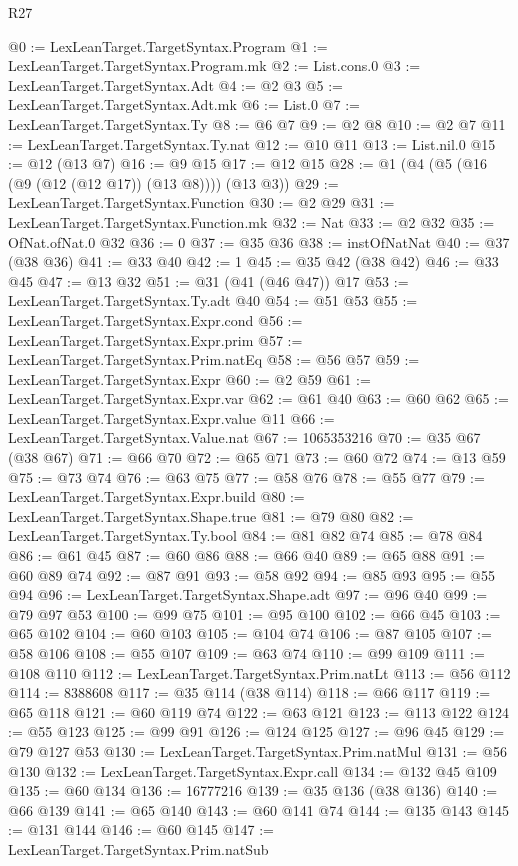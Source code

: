 \begin{lexlean}{R27}
\begin{coremodule}
@0 := LexLeanTarget.TargetSyntax.Program
@1 := LexLeanTarget.TargetSyntax.Program.mk
@2 := List.cons.{0}
@3 := LexLeanTarget.TargetSyntax.Adt
@4 := @2 @3
@5 := LexLeanTarget.TargetSyntax.Adt.mk
@6 := List.{0}
@7 := LexLeanTarget.TargetSyntax.Ty
@8 := @6 @7
@9 := @2 @8
@10 := @2 @7
@11 := LexLeanTarget.TargetSyntax.Ty.nat
@12 := @10 @11
@13 := List.nil.{0}
@15 := @12 (@13 @7)
@16 := @9 @15
@17 := @12 @15
@28 := @1 (@4 (@5 (@16 (@9 (@12 (@12 @17)) (@13 @8)))) (@13 @3))
@29 := LexLeanTarget.TargetSyntax.Function
@30 := @2 @29
@31 := LexLeanTarget.TargetSyntax.Function.mk
@32 := Nat
@33 := @2 @32
@35 := OfNat.ofNat.{0} @32
@36 := 0
@37 := @35 @36
@38 := instOfNatNat
@40 := @37 (@38 @36)
@41 := @33 @40
@42 := 1
@45 := @35 @42 (@38 @42)
@46 := @33 @45
@47 := @13 @32
@51 := @31 (@41 (@46 @47)) @17
@53 := LexLeanTarget.TargetSyntax.Ty.adt @40
@54 := @51 @53
@55 := LexLeanTarget.TargetSyntax.Expr.cond
@56 := LexLeanTarget.TargetSyntax.Expr.prim
@57 := LexLeanTarget.TargetSyntax.Prim.natEq
@58 := @56 @57
@59 := LexLeanTarget.TargetSyntax.Expr
@60 := @2 @59
@61 := LexLeanTarget.TargetSyntax.Expr.var
@62 := @61 @40
@63 := @60 @62
@65 := LexLeanTarget.TargetSyntax.Expr.value @11
@66 := LexLeanTarget.TargetSyntax.Value.nat
@67 := 1065353216
@70 := @35 @67 (@38 @67)
@71 := @66 @70
@72 := @65 @71
@73 := @60 @72
@74 := @13 @59
@75 := @73 @74
@76 := @63 @75
@77 := @58 @76
@78 := @55 @77
@79 := LexLeanTarget.TargetSyntax.Expr.build
@80 := LexLeanTarget.TargetSyntax.Shape.true
@81 := @79 @80
@82 := LexLeanTarget.TargetSyntax.Ty.bool
@84 := @81 @82 @74
@85 := @78 @84
@86 := @61 @45
@87 := @60 @86
@88 := @66 @40
@89 := @65 @88
@91 := @60 @89 @74
@92 := @87 @91
@93 := @58 @92
@94 := @85 @93
@95 := @55 @94
@96 := LexLeanTarget.TargetSyntax.Shape.adt
@97 := @96 @40
@99 := @79 @97 @53
@100 := @99 @75
@101 := @95 @100
@102 := @66 @45
@103 := @65 @102
@104 := @60 @103
@105 := @104 @74
@106 := @87 @105
@107 := @58 @106
@108 := @55 @107
@109 := @63 @74
@110 := @99 @109
@111 := @108 @110
@112 := LexLeanTarget.TargetSyntax.Prim.natLt
@113 := @56 @112
@114 := 8388608
@117 := @35 @114 (@38 @114)
@118 := @66 @117
@119 := @65 @118
@121 := @60 @119 @74
@122 := @63 @121
@123 := @113 @122
@124 := @55 @123
@125 := @99 @91
@126 := @124 @125
@127 := @96 @45
@129 := @79 @127 @53
@130 := LexLeanTarget.TargetSyntax.Prim.natMul
@131 := @56 @130
@132 := LexLeanTarget.TargetSyntax.Expr.call
@134 := @132 @45 @109
@135 := @60 @134
@136 := 16777216
@139 := @35 @136 (@38 @136)
@140 := @66 @139
@141 := @65 @140
@143 := @60 @141 @74
@144 := @135 @143
@145 := @131 @144
@146 := @60 @145
@147 := LexLeanTarget.TargetSyntax.Prim.natSub

\end{coremodule}
\end{lexlean}
